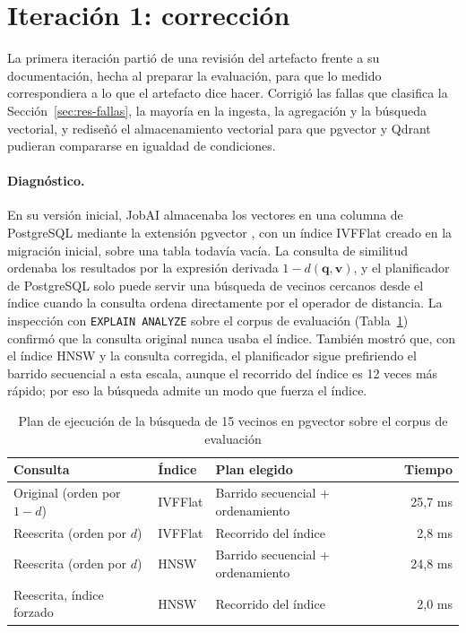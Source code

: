 \section{Iteración 1: corrección}
\label{sec:art-vectorial}

La primera iteración partió de una revisión del artefacto frente a su documentación, hecha al preparar la evaluación, para que lo medido correspondiera a lo que el artefacto dice hacer. Corrigió las fallas que clasifica la Sección~\ref{sec:res-fallas}, la mayoría en la ingesta, la agregación y la búsqueda vectorial, y rediseñó el almacenamiento vectorial para que pgvector y Qdrant pudieran compararse en igualdad de condiciones.

\paragraph{Diagnóstico.} En su versión inicial, JobAI almacenaba los vectores en una columna de PostgreSQL mediante la extensión pgvector \citep{Pgvector}, con un índice IVFFlat creado en la migración inicial, sobre una tabla todavía vacía. La consulta de similitud ordenaba los resultados por la expresión derivada $1 - d(\mathbf{q}, \mathbf{v})$, y el planificador de PostgreSQL solo puede servir una búsqueda de vecinos cercanos desde el índice cuando la consulta ordena directamente por el operador de distancia. La inspección con \texttt{EXPLAIN ANALYZE} sobre el corpus de evaluación (Tabla~\ref{tab:art-explain}) confirmó que la consulta original nunca usaba el índice. También mostró que, con el índice HNSW y la consulta corregida, el planificador sigue prefiriendo el barrido secuencial a esta escala, aunque el recorrido del índice es 12 veces más rápido; por eso la búsqueda admite un modo que fuerza el índice.

\begin{table}[htbp!]
    \centering
    \caption{Plan de ejecución de la búsqueda de 15 vecinos en pgvector sobre el corpus de evaluación}
    \label{tab:art-explain}
    \small
    \begin{tabular}{|p{5.2cm}|p{2.2cm}|p{4.6cm}|r|}
        \hline
        \textbf{Consulta} & \textbf{Índice} & \textbf{Plan elegido} & \textbf{Tiempo} \\
        \hline
        Original (orden por $1-d$) & IVFFlat & Barrido secuencial + ordenamiento & 25,7 ms \\
        \hline
        Reescrita (orden por $d$) & IVFFlat & Recorrido del índice & 2,8 ms \\
        \hline
        Reescrita (orden por $d$) & HNSW & Barrido secuencial + ordenamiento & 24,8 ms \\
        \hline
        Reescrita, índice forzado & HNSW & Recorrido del índice & 2,0 ms \\
        \hline
    \end{tabular}
\end{table}

